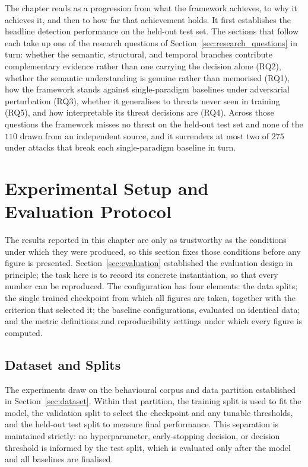 \documentclass[%
    BCOR=10mm,
    DIV=13,
    toc=bibliography,
    toc=listof,
    oneside,
    12pt,
]{scrbook}
\begin{document}
The chapter reads as a progression from what the framework achieves, to why it
achieves it, and then to how far that achievement holds. It first establishes
the headline detection performance on the held-out test set. The sections that
follow each take up one of the research questions of
Section~\ref{sec:research_questions} in turn: whether the semantic,
structural, and temporal branches contribute complementary evidence rather
than one carrying the decision alone (RQ2), whether the semantic understanding
is genuine rather than memorised (RQ1), how the framework stands against
single-paradigm baselines under adversarial perturbation (RQ3), whether it
generalises to threats never seen in training (RQ5), and how interpretable its
threat decisions are (RQ4). Across those questions the framework misses no
threat on the held-out test set and none of the $110$ drawn from an
independent source, and it surrenders at most two of $275$ under attacks that
break each single-paradigm baseline in turn.


\section{Experimental Setup and Evaluation Protocol}
\label{sec:exp_setup}

The results reported in this chapter are only as trustworthy as the conditions
under which they were produced, so this section fixes those conditions before
any figure is presented. Section~\ref{sec:evaluation} established the
evaluation design in principle; the task here is to record its concrete
instantiation, so that every number can be reproduced. The configuration has
four elements: the data splits; the single trained checkpoint from which all
figures are taken, together with the criterion that selected it; the baseline
configurations, evaluated on identical data; and the metric definitions and
reproducibility settings under which every figure is computed.

\subsection{Dataset and Splits}
\label{subsec:exp_dataset}

The experiments draw on the behavioural corpus and data partition established in
Section~\ref{sec:dataset}. Within that partition, the training split is used to
fit the model, the validation split to select the checkpoint and any tunable
thresholds, and the held-out test split to measure final performance. This
separation is maintained strictly: no hyperparameter,
early-stopping decision, or decision threshold is informed by the test split,
which is evaluated only after the model and all baselines are finalised.
\end{document}
